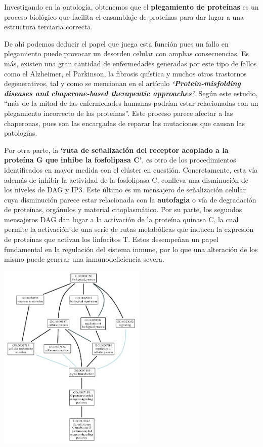 Investigando en la ontología, obtenemos que el \textbf{plegamiento de proteínas} es un proceso biológico que facilita el ensamblaje de proteínas para dar lugar a una estructura terciaria correcta.


De ahí podemos deducir el papel que juega esta función pues un fallo en plegamiento puede provocar un desorden celular con amplias consecuencias. Es más, existen una gran cantidad de enfermedades generadas por este tipo de fallos como el Alzheimer, el Parkinson, la fibrosis quística y muchos otros trastornos degenerativos, tal y como se mencionan en el artículo \textbf{\textit{‘Protein-misfolding diseases and chaperone-based therapeutic approaches’}}.
Según este estudio, “más de la mitad de las enfermedades humanas podrían estar relacionadas con un plegamiento incorrecto de las proteínas”. Este proceso parece afectar a las chaperonas, pues son las encargadas de reparar las mutaciones que causan las patologías.

Por otra parte, la \textbf{‘ruta de señalización del receptor acoplado a la proteína G que inhibe la fosfolipasa C’}, es otro de los procedimientos identificados en mayor medida con el clúster en cuestión.   Concretamente, esta vía además de inhibir la actividad de la fosfolipasa C, conlleva una disminución de los niveles de DAG y IP3. Este último es un mensajero de señalización celular cuya disminución parece estar relacionada con la \textbf{autofagia} o vía de degradación de proteínas, orgánulos y material citoplasmático. Por su parte, los segundos mensajeros DAG dan lugar a la activación de la proteína quinasa C, la cual permite la activación de una serie de rutas metabólicas que inducen la expresión de proteínas que activan los linfocitos T. Estos desempeñan un papel fundamental en la regulación del sistema inmune, por lo que una alteración de los mismo puede generar una inmunodeficiencia severa.

\begin{center}
\includegraphics[width=70mm,scale=1]{report/figures/signaling pathway.png}
\end{center}

